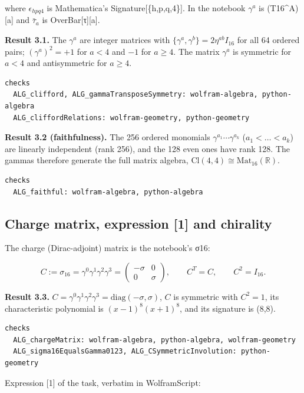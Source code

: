 \documentclass[11pt]{article}
\begin{document}
where $\epsilon_{hpq4}$ is Mathematica's Signature[\{h,p,q,4\}]. In the notebook $\gamma^a$ is (T16\textasciicircum{}A)[a] and $\bar\tau_a$ is OverBar[τ][a].

\textbf{Result 3.1.} The $\gamma^a$ are integer matrices with $\{\gamma^a,\gamma^b\}=2\eta^{ab}I_{16}$ for all 64 ordered pairs; $(\gamma^a)^2=+1$ for $a<4$ and $-1$ for $a\ge4$. The matrix $\gamma^a$ is symmetric for $a<4$ and antisymmetric for $a\ge4$.

\begin{Verbatim}[fontsize=\small]
checks
  ALG_clifford, ALG_gammaTransposeSymmetry: wolfram-algebra, python-algebra
  ALG_cliffordRelations: wolfram-geometry, python-geometry
\end{Verbatim}

\textbf{Result 3.2 (faithfulness).} The 256 ordered monomials $\gamma^{a_1}\cdots\gamma^{a_k}$ ($a_1<\dots<a_k$) are linearly independent (rank 256), and the 128 even ones have rank 128. The gammas therefore generate the full matrix algebra, $\mathrm{Cl}(4,4)\cong\mathrm{Mat}_{16}(\mathbb R)$.

\begin{Verbatim}[fontsize=\small]
checks
  ALG_faithful: wolfram-algebra, python-algebra
\end{Verbatim}

\subsection{Charge matrix, expression [1] and chirality}

The charge (Dirac-adjoint) matrix is the notebook's σ16:

\[
C:=\sigma_{16}=\gamma^0\gamma^1\gamma^2\gamma^3=\begin{pmatrix}-\sigma&0\\ 0&\sigma\end{pmatrix},\qquad C^T=C,\qquad C^2=I_{16}.
\]

\textbf{Result 3.3.} $C=\gamma^0\gamma^1\gamma^2\gamma^3=\mathrm{diag}(-\sigma,\sigma)$, $C$ is symmetric with $C^2=1$, its characteristic polynomial is $(x-1)^8(x+1)^8$, and its signature is (8,8).

\begin{Verbatim}[fontsize=\small]
checks
  ALG_chargeMatrix: wolfram-algebra, python-algebra, wolfram-geometry
  ALG_sigma16EqualsGamma0123, ALG_CSymmetricInvolution: python-geometry
\end{Verbatim}

Expression [1] of the task, verbatim in WolframScript:
\end{document}
